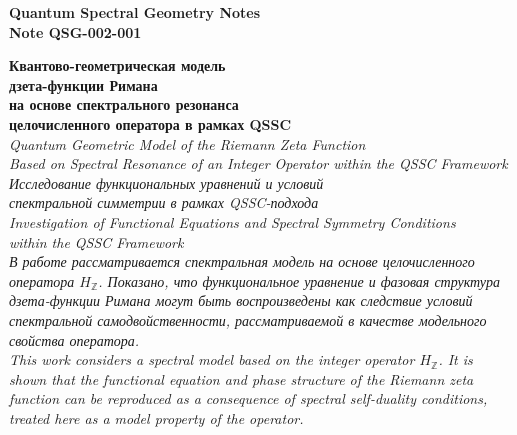 \documentclass{article}
\numberwithin{equation}{section}
\theoremstyle{plain}
\theoremstyle{definition}
\theoremstyle{remark}
\begin{document}
	\sloppy
	
	\begin{titlepage}
		\centering
		
		{\Large\textbf{Quantum Spectral Geometry Notes}}\\[4pt]
		{\large\textbf{Note QSG-002-001}}\\[16pt]
		
		\vspace*{\fill}
		
		{\Large\textbf{
				Квантово-геометрическая модель \\ дзета-функции Римана \\ 
				на основе спектрального резонанса \\ целочисленного оператора в рамках QSSC
		}}\\[12pt]
		
		{\large\textit{
				Quantum Geometric Model of the Riemann Zeta Function \\ 
				Based on Spectral Resonance of an Integer Operator within the QSSC Framework
		}}\\[20pt]
		
		{\normalsize\textit{
				Исследование функциональных уравнений и условий\\
				спектральной симметрии в рамках QSSC-подхода
		}}\\[8pt]
		
		{\footnotesize\textit{
				Investigation of Functional Equations and Spectral Symmetry Conditions\\
				within the QSSC Framework
		}}\\[18pt]
		
		{\footnotesize\textit{
				В работе рассматривается спектральная модель на основе целочисленного оператора $H_{\mathbb{Z}}$.
				Показано, что функциональное уравнение и фазовая структура дзета-функции Римана
				могут быть воспроизведены как следствие условий спектральной самодвойственности,
				рассматриваемой в качестве модельного свойства оператора.
		}}\\[6pt]
		
		{\scriptsize\textit{
				This work considers a spectral model based on the integer operator $H_{\mathbb{Z}}$.
				It is shown that the functional equation and phase structure of the Riemann zeta function
				can be reproduced as a consequence of spectral self-duality conditions,
				treated here as a model property of the operator.
		}}\\[40pt]
		

\end{titlepage}
\end{document}
